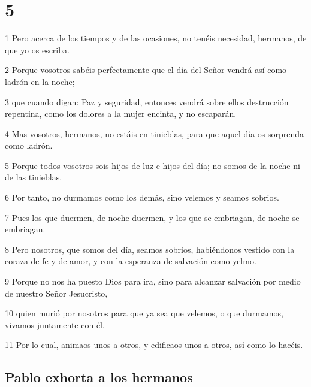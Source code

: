 \chapter{5}

\par 1 Pero acerca de los tiempos y de las ocasiones, no tenéis necesidad, hermanos, de que yo os escriba.
\par 2 Porque vosotros sabéis perfectamente que el día del Señor vendrá así como ladrón en la noche;
\par 3 que cuando digan: Paz y seguridad, entonces vendrá sobre ellos destrucción repentina, como los dolores a la mujer encinta, y no escaparán.
\par 4 Mas vosotros, hermanos, no estáis en tinieblas, para que aquel día os sorprenda como ladrón.
\par 5 Porque todos vosotros sois hijos de luz e hijos del día; no somos de la noche ni de las tinieblas.
\par 6 Por tanto, no durmamos como los demás, sino velemos y seamos sobrios.
\par 7 Pues los que duermen, de noche duermen, y los que se embriagan, de noche se embriagan.
\par 8 Pero nosotros, que somos del día, seamos sobrios, habiéndonos vestido con la coraza de fe y de amor, y con la esperanza de salvación como yelmo.
\par 9 Porque no nos ha puesto Dios para ira, sino para alcanzar salvación por medio de nuestro Señor Jesucristo,
\par 10 quien murió por nosotros para que ya sea que velemos, o que durmamos, vivamos juntamente con él.
\par 11 Por lo cual, animaos unos a otros, y edificaos unos a otros, así como lo hacéis.

\section*{Pablo exhorta a los hermanos}

